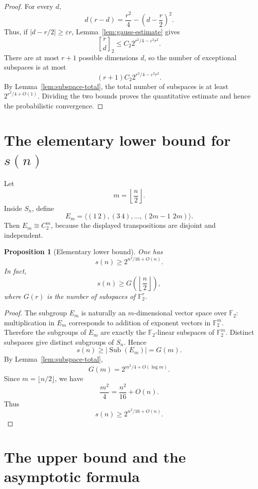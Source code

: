 \documentclass[a4paper,11pt]{amsart}
\newtheorem{proposition}[theorem]{Proposition}
\theoremstyle{remark}
\newcommand{\Sub}{\operatorname{Sub}}
\newcommand{\F}{\mathbb F}
\newcommand{\gbinom}[2]{\genfrac{[}{]}{0pt}{}{#1}{#2}_2}
\begin{document}
\begin{proof}
For every \(d\),
\[
        d(r-d)=\frac{r^2}{4}-\left(d-\frac r2\right)^2.
\]
Thus, if \(|d-r/2|\geq \varepsilon r\), Lemma~\ref{lem:gauss-estimate} gives
\[
        \gbinom{r}{d}\leq C_2 2^{r^2/4-\varepsilon^2r^2}.
\]
There are at most \(r+1\) possible dimensions \(d\), so the number of exceptional subspaces is at
most
\[
        (r+1)C_2 2^{r^2/4-\varepsilon^2r^2}.
\]
By Lemma~\ref{lem:subspace-total}, the total number of subspaces is at least
\(2^{r^2/4+O(1)}\). Dividing the two bounds proves the quantitative estimate and hence the
probabilistic convergence.
\end{proof}

\section{The elementary lower bound for \texorpdfstring{\(s(n)\)}{s(n)}}

Let
\[
        m=\left\lfloor \frac n2\right\rfloor.
\]
Inside \(S_n\), define
\[
        E_m=\langle (1\,2),(3\,4),\ldots,(2m-1\,\,2m)\rangle.
\]
Then \(E_m\cong C_2^m\), because the displayed transpositions are disjoint and independent.

\begin{proposition}[Elementary lower bound]\label{prop:lower}
One has
\[
        s(n)\geq 2^{n^2/16+O(n)}.
\]
In fact,
\[
        s(n)\geq G\left(\left\lfloor \frac n2\right\rfloor\right),
\]
where \(G(r)\) is the number of subspaces of \(\F_2^r\).
\end{proposition}

\begin{proof}
The subgroup \(E_m\) is naturally an \(m\)-dimensional vector space over \(\F_2\): multiplication
in \(E_m\) corresponds to addition of exponent vectors in \(\F_2^m\). Therefore the subgroups of
\(E_m\) are exactly the \(\F_2\)-linear subspaces of \(\F_2^m\). Distinct subspaces give distinct
subgroups of \(S_n\). Hence
\[
        s(n)\geq |\Sub(E_m)|=G(m).
\]
By Lemma~\ref{lem:subspace-total},
\[
        G(m)=2^{m^2/4+O(\log m)}.
\]
Since \(m=\lfloor n/2\rfloor\), we have
\[
        \frac{m^2}{4}=\frac{n^2}{16}+O(n).
\]
Thus
\[
        s(n)\geq 2^{n^2/16+O(n)}.
\]
\end{proof}

\section{The upper bound and the asymptotic formula}
\end{document}
